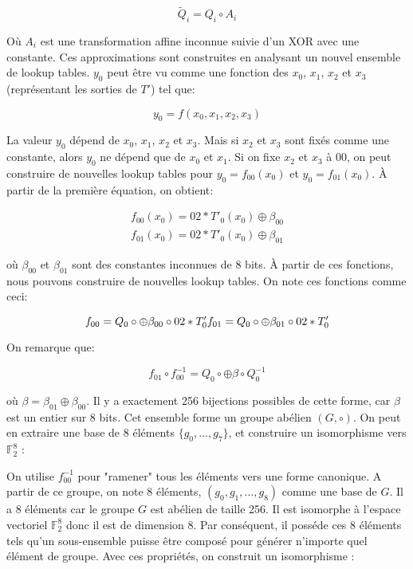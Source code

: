 \documentclass[a4paper, 10pt]{article}
\begin{document}
\[
  \widetilde{Q}_{i} = Q_{i} \circ A_{i}
\]

Où $A_{i}$ est une transformation affine inconnue suivie d'un XOR avec une constante. 
Ces approximations sont construites en analysant un nouvel ensemble de lookup tables.
$y_{0}$ peut être vu 
comme une fonction des $x_{0}$, $x_{1}$, $x_{2}$ et $x_{3}$ (représentant les sorties de $T'$) tel que:

\[
  y_{0} = f(x_{0}, x_{1}, x_{2}, x_{3})
\]

La valeur $y_{0}$ dépend de $x_{0}$, $x_{1}$, $x_{2}$ et $x_{3}$. Mais si $x_{2}$ et $x_{3}$ 
sont fixés comme une constante, alors $y_{0}$ ne dépend que de $x_{0}$ et $x_{1}$.
Si on fixe $x_{2}$ et $x_{3}$ à $00$, on peut construire de nouvelles lookup tables pour $y_{0} = f_{00}(x_{0})$ 
et $y_{0} = f_{01}(x_{0})$. À partir de la première équation, on obtient:

\begin{align*}
  f_{00}(x_{0}) = 02 * T'_{0}(x_{0}) \oplus \beta_{00}\\
  f_{01}(x_{0}) = 02 * T'_{0}(x_{0}) \oplus \beta_{01}
\end{align*}

où $\beta_{00}$ et $\beta_{01}$ sont des constantes inconnues de 8 bits.
À partir de ces fonctions, nous pouvons construire de nouvelles lookup tables. On note ces fonctions comme ceci:

\[
f_{00} = Q_{0} \circ \oplus \beta_{00} \circ 02 * T'_{0}\\
f_{01} = Q_{0} \circ \oplus \beta_{01} \circ 02 * T'_{0}
\]

On remarque que:

\[
  f_{01} \circ f_{00}^{-1} = Q_{0} \circ \oplus \beta \circ Q_{0}^{-1}
\]

où $\beta = \beta_{01} \oplus \beta_{00}$. Il y a exactement 256 bijections possibles de cette forme, car $\beta$ est un entier sur 8 bits. 
Cet ensemble forme un groupe abélien $(G, \circ)$. On peut en extraire une base de 8 éléments $\{g_0, ..., g_7\}$, et construire un isomorphisme vers $\mathbb{F}_2^8$ :

On utilise $f_{00}^{-1}$ pour "ramener" tous les éléments vers une forme canonique.
A partir de ce groupe, on note 8 éléments, $(g_{0}, g_{1}, ..., g_{8})$ comme une base de $G$.
Il a 8 éléments car le groupe $G$ est abélien de taille 256. Il est isomorphe à l'espace vectoriel $\mathbb{F}_{2}^{8}$ donc il est de 
dimension 8. Par conséquent, il posséde ces 8 éléments tels qu'un 
sous-ensemble puisse être composé pour générer n'importe quel élément de groupe. Avec ces propriétés, on construit 
un isomorphisme :
\end{document}
